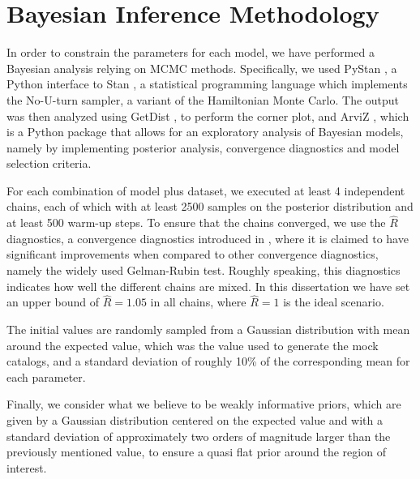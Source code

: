 \section{Bayesian Inference Methodology}
\label{sec:sampling-methodology}

In order to constrain the parameters for each model, we have performed a Bayesian analysis relying on \gls{MCMC} methods. Specifically, we used PyStan \cite{PyStan}, a Python interface to Stan \cite{Stan}, a statistical programming language which implements the No-U-turn sampler, a variant of the Hamiltonian Monte Carlo. The output was then analyzed using GetDist \cite{GetDist}, to perform the corner plot, and ArviZ \cite{arviz}, which is a Python package that allows for an exploratory analysis of Bayesian models, namely by implementing posterior analysis, convergence diagnostics and model selection criteria.

For each combination of model plus dataset, we executed at least 4 independent chains, each of which with at least 2500 samples on the posterior distribution and at least 500 warm-up steps. To ensure that the chains converged, we use the $\hat{R}$ diagnostics, a convergence diagnostics introduced in \cite{Vehtari2021}, where it is claimed to have significant improvements when compared to other convergence diagnostics, namely the widely used Gelman-Rubin test. Roughly speaking, this diagnostics indicates how well the different chains are mixed. In this dissertation we have set an upper bound of $\hat{R} = 1.05$ in all chains, where $\hat{R} = 1$ is the ideal scenario.

The initial values are randomly sampled from a Gaussian distribution with mean around the expected value, which was the value used to generate the mock catalogs, and a standard deviation of roughly 10\% of the corresponding mean for each parameter.

Finally, we consider what we believe to be weakly informative priors, which are given by a Gaussian distribution centered on the expected value and with a standard deviation of approximately two orders of magnitude larger than the previously mentioned value, to ensure a quasi flat prior around the region of interest.


